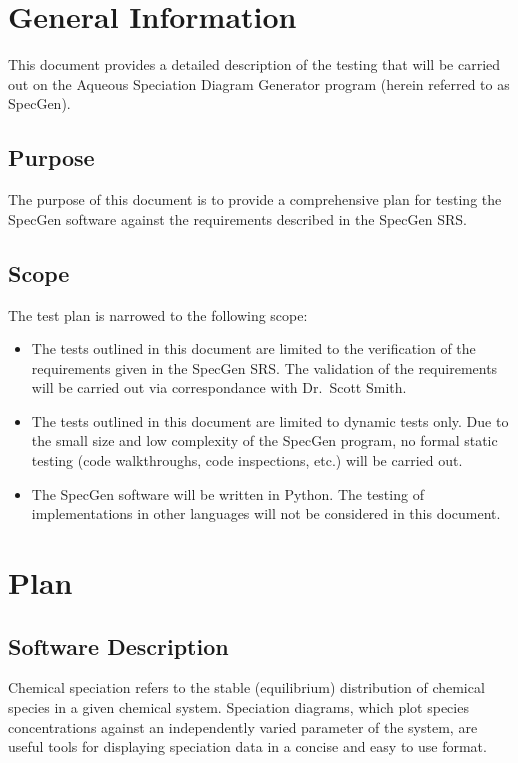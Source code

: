 \documentclass[12pt, titlepage]{article}
\newcommand{\progname}{SpecGen}
\begin{document}
\setcounter{secnumdepth}{3}

\section{General Information}

This document provides a detailed description of the testing that will be 
carried out on the Aqueous Speciation Diagram Generator program (herein referred 
to as \progname{}).  

\subsection{Purpose}
The purpose of this document is to provide a comprehensive plan for testing the 
\progname{} software against the requirements described in the
\progname{} SRS.  

\subsection{Scope}
The test plan is narrowed to the following scope:
\begin{itemize}
\item The tests outlined in this document are limited to the verification of the 
  requirements given in the \progname{} SRS.  The validation of the requirements 
  will be carried out via correspondance with Dr.\ Scott Smith.
\item The tests outlined in this document are limited to dynamic tests only.  
  Due to the small size and low complexity of the \progname{} program, no formal
  static testing (code walkthroughs, code inspections, etc.) will be carried out.
\item The \progname{} software will be written in Python.  The testing of 
  implementations in other languages will not be considered in this document.
\end{itemize}

\section{Plan}
\label{SecPlan}
	
\subsection{Software Description}
Chemical speciation refers to the stable (equilibrium) distribution of chemical 
species in a given chemical system.   Speciation diagrams, which plot species 
concentrations against an independently varied parameter of the system, are 
useful tools for displaying speciation data in a concise and easy to use format.  
\end{document}
